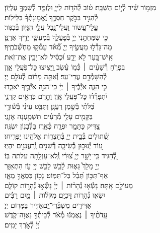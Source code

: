 \documentclass[twoside, openany, parskip=half, 11pt]{book}
\begin{document}
\begin{narrow}
מִזְמ֥וֹר שִׁ֗יר לְ֯י֣וֹם הַשַּׁבָּֽת׃\hfill \break
ט֗וֹב לְ֯הֹד֥וֹת לַייָ֑ \hfill וּלְזַמֵּ֖ר לְ֯שִׁמְךָ֣ עֶלְיֽוֹן׃ \\
לְ֯הַגִּ֣יד בַּבֹּ֣קֶר חַסְדֶּ֑ךָ \hfill וֶ֝אֱמ֥וּנָתְ֯ךָ֗ בַּלֵּילֽוֹת׃ \\
עֲֽלֵי־עָ֭שׂוֹר וַעֲלֵי־נָ֑בֶל \hfill עֲלֵ֖י הִגָּי֣וֹן בְּ֯כִנּֽוֹר׃ \\
כִּ֤י שִׂמַּחְתַּ֣נִי יְיָ֣ בְּ֯פׇעֳלֶ֑ךָ \hfill בְּֽ֯מַעֲשֵׂ֖י יָדֶ֣יךָ אֲרַנֵּֽן׃ \\
מַה־גָּדְ֯ל֣וּ מַעֲשֶׂ֣יךָ יְיָ֑ \hfill מְ֯֝אֹ֗ד עָמְ֯ק֥וּ מַחְשְׁ֯בֹתֶֽיךָ׃ \\
אִֽישׁ־בַּ֭עַר לֹ֣א יֵדָ֑ע \hfill וּ֝כְסִ֗יל לֹא־יָבִ֥ין אֶת־זֹֽאת׃ \\
בִּפְרֹ֤חַ רְ֯שָׁעִ֨ים ׀ כְּ֯מ֥וֹ עֵ֗שֶׂב \hfill וַ֭יָּצִיצוּ כׇּל־פֹּ֣עֲלֵי אָ֑וֶן\\ לְ֯הִשָּׁמְ֯דָ֥ם עֲדֵי־עַֽד׃ \hfill
וְ֯אַתָּ֥ה מָר֗וֹם לְ֯עֹלָ֥ם יְיָ׃ \\
כִּ֤י הִנֵּ֪ה אֹיְ֯בֶ֡יךָ ׀ יְיָ֗ \hfill כִּֽי־הִנֵּ֣ה אֹיְ֯בֶ֣יךָ יֹאבֵ֑דוּ\\ יִ֝תְפָּרְ֯ד֗וּ כׇּל־פֹּ֥עֲלֵי אָֽוֶן׃ \hfill
וַתָּ֣רֶם כִּרְאֵ֣ים קַרְנִ֑י\\ בַּ֝לֹּתִ֗י בְּ֯שֶׁ֣מֶן רַעֲנָֽן׃ \hfill
וַתַּבֵּ֥ט עֵינִ֗י בְּ֯שׁ֫וּרָ֥י\\ בַּקָּמִ֖ים עָלַ֥י מְ֯רֵעִ֗ים \hfill תִּשְׁמַ֥עְנָה אׇזְנָֽי׃ \\
צַ֭דִּיק כַּתָּמָ֣ר יִפְרָ֑ח \hfill כְּ֯אֶ֖רֶז בַּלְּ֯בָנ֣וֹן יִשְׂגֶּֽה׃ \\
שְׁ֭֯תוּלִים בְּ֯בֵ֣ית יְיָ֑ \hfill בְּ֯חַצְר֖וֹת אֱלֹהֵ֣ינוּ יַפְרִֽיחוּ׃ \\
ע֭וֹד יְ֯נוּב֣וּן בְּ֯שֵׂיבָ֑ה \hfill דְּ֯שֵׁנִ֖ים וְֽ֯רַעֲנַנִּ֣ים יִהְיֽוּ׃ \\
לְ֭֯הַגִּיד כִּֽי־יָשָׁ֣ר יְיָ֑ \hfill צ֝וּרִ֗י וְֽ֯לֹא־עַוְלָ֥תָה עלתה בּֽוֹ׃ \\



יְיָ֣ מָלָךְ֮ גֵּא֢וּת לָ֫בֵ֥שׁ\hfill
לָבֵ֣שׁ יְיָ֭ עֹ֣ז הִתְאַזָּ֑ר\\ אַף־תִּכּ֥וֹן תֵּ֝בֵ֗ל בַּל־תִּמּֽוֹט׃ \hfill
נָכ֣וֹן כִּסְאֲךָ֣ מֵאָ֑ז\\ מֵעוֹלָ֣ם אָֽתָּה׃ \hfill
נָשְׂ֯א֤וּ נְ֯הָר֨וֹת ׀ יְיָ֗ נָשְׂ֯א֣וּ נְ֯הָר֣וֹת קוֹלָ֑ם\\ יִשְׂא֖וּ נְ֯הָר֣וֹת דׇּכְיָֽם׃ \hfill
מִקֹּל֨וֹת ׀ מַ֤יִם רַבִּ֗ים\\ אַדִּירִ֣ים מִשְׁבְּ֯רֵי־יָ֑ם\hfill אַדִּ֖יר בַּמָּר֣וֹם יְיָ׃ \\
עֵֽדֹתֶ֨יךָ ׀ נֶאֶמְנ֬וּ מְ֯אֹ֗ד \hfill לְ֯בֵיתְ֯ךָ֥ נַאֲוָה־קֹ֑דֶשׁ\\ יְ֝יָ֗ לְ֯אֹ֣רֶךְ יָמִֽים׃ \hfill \break

\end{narrow}
\end{document}
